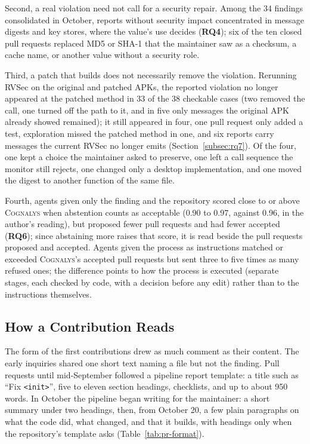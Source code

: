 \documentclass[conference]{IEEEtran}
\newcommand{\system}{\textsc{Cognalys}}
\newcommand{\researchq}[1]{\textbf{RQ#1}}
\begin{document}
Second, a real violation need not call for a security repair. Among the 34
findings consolidated in October, reports without security impact concentrated
in message digests and key stores, where the value's use decides
(\researchq{4}); six of the ten closed pull requests replaced MD5 or SHA-1 that
the maintainer saw as a checksum, a cache name, or another value without a
security role.

Third, a patch that builds does not necessarily remove the violation.
Rerunning RVSec on the original and patched APKs, the reported violation no
longer appeared at the patched method in 33 of the 38 checkable cases (two
removed the call, one turned off the path to it, and in five only messages the
original APK already showed remained); it still appeared in four, one pull
request only added a test, exploration missed the patched method in one, and
six reports carry messages the current RVSec no longer emits
(Section~\ref{subsec:rq7}). Of the four, one kept a choice the maintainer asked
to preserve, one left a call sequence the monitor still rejects, one changed
only a desktop implementation, and one moved the digest to another function of
the same file.

Fourth, agents given only the finding and the repository scored close to or
above \system{} when abstention counts as acceptable (0.90 to 0.97, against
0.96, in the author's reading), but proposed fewer pull requests and had fewer
accepted (\researchq{6}); since abstaining more raises that score, it is read
beside the pull requests proposed and accepted. Agents given the process
as instructions matched or exceeded \system{}'s accepted pull requests but sent
three to five times as many refused ones; the difference points to how the
process is executed (separate stages, each checked by code, with a decision
before any edit) rather than to the instructions themselves.

\subsection{How a Contribution Reads}
\label{subsec:form}

The form of the first contributions drew as much comment as their content. The
early inquiries shared one short text naming a file but not the finding. Pull
requests until mid-September followed a pipeline report template: a title such
as ``Fix \texttt{<init>}'', five to eleven section headings, checklists, and up
to about 950 words. In October the pipeline began writing for the maintainer:
a short summary under two headings, then, from October 20, a few plain
paragraphs on what the code did, what changed, and that it builds, with
headings only when the repository's template asks (Table~\ref{tab:pr-format}).
\end{document}
